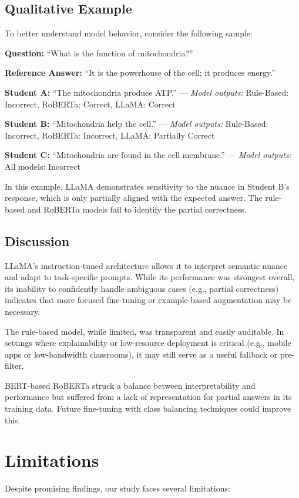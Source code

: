\documentclass[11pt]{article}
\begin{document}
\subsection{Qualitative Example}
To better understand model behavior, consider the following sample:

\textbf{Question:} “What is the function of mitochondria?”

\textbf{Reference Answer:} “It is the powerhouse of the cell; it produces energy.”

\textbf{Student A:} “The mitochondria produce ATP.” — \textit{Model outputs:} Rule-Based: Incorrect, RoBERTa: Correct, LLaMA: Correct

\textbf{Student B:} “Mitochondria help the cell.” — \textit{Model outputs:} Rule-Based: Incorrect, RoBERTa: Incorrect, LLaMA: Partially Correct

\textbf{Student C:} “Mitochondria are found in the cell membrane.” — \textit{Model outputs:} All models: Incorrect

In this example, LLaMA demonstrates sensitivity to the nuance in Student B’s response, which is only partially aligned with the expected answer. The rule-based and RoBERTa models fail to identify the partial correctness.

\subsection{Discussion}
LLaMA’s instruction-tuned architecture allows it to interpret semantic nuance and adapt to task-specific prompts. While its performance was strongest overall, its inability to confidently handle ambiguous cases (e.g., partial correctness) indicates that more focused fine-tuning or example-based augmentation may be necessary.

The rule-based model, while limited, was transparent and easily auditable. In settings where explainability or low-resource deployment is critical (e.g., mobile apps or low-bandwidth classrooms), it may still serve as a useful fallback or pre-filter.

BERT-based RoBERTa struck a balance between interpretability and performance but suffered from a lack of representation for partial answers in its training data. Future fine-tuning with class balancing techniques could improve this.

\section{Limitations}
Despite promising findings, our study faces several limitations:
\end{document}
